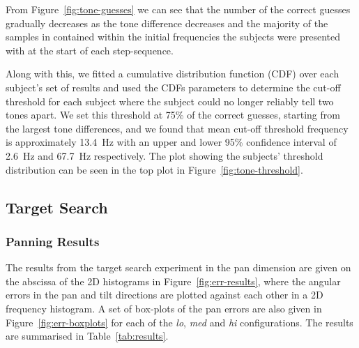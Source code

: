 \documentclass[format=sigconf, review=true, screen=true, anonymous=true]{acmart}
\begin{document}
From Figure~\ref{fig:tone-guesses} we can see that the number of the correct guesses gradually decreases as the tone difference decreases and the majority of the samples in contained within the initial frequencies the subjects were presented with at the start of each step-sequence. 

Along with this, we fitted a cumulative distribution function (CDF) over each subject's set of results and used the CDFs parameters to determine the cut-off threshold for each subject where the subject could no longer reliably tell two tones apart. We set this threshold at 75\% of the correct guesses, starting from the largest tone differences, and we found that mean cut-off threshold frequency is approximately \SI{13.4}{\hertz} with an upper and lower 95\% confidence interval of \SI{2.6}{\hertz} and \SI{67.7}{\hertz} respectively. The plot showing the subjects' threshold distribution can be seen in the top plot in Figure~\ref{fig:tone-threshold}. 


\subsection{Target Search}

\subsubsection{Panning Results}

The results from the target search experiment in the pan dimension are given on the abscissa of the 2D histograms in Figure~\ref{fig:err-results}, where the angular errors in the pan and tilt directions are plotted against each other in a 2D frequency histogram. A set of box-plots of the pan errors are also given in Figure~\ref{fig:err-boxplots} for each of the \emph{lo}, \emph{med} and \emph{hi} configurations. The results are summarised in Table~\ref{tab:results}.
\end{document}

